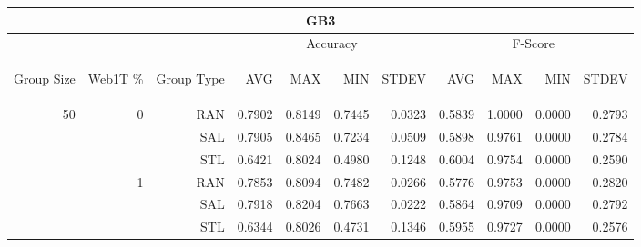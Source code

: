 \begin{center}
\begin{table}[htbp]
\begin{tabular}{ | r | r | r | r | r | r | r | r | r | r | r |}
\hline
\multicolumn{11}{|c|}{GB3}\\
\hline
 & & & \multicolumn{4}{|c|}{Accuracy} & \multicolumn{4}{|c|}{F-Score}\\ \cline{4-11}
\begin{sideways}Group Size\end{sideways} & \begin{sideways}Web1T \%\end{sideways} & \begin{sideways}Group Type\end{sideways} & \begin{sideways}AVG\end{sideways} & \begin{sideways}MAX\end{sideways} & \begin{sideways}MIN\end{sideways} & \begin{sideways}STDEV\end{sideways} & \begin{sideways}AVG\end{sideways} & \begin{sideways}MAX\end{sideways} & \begin{sideways}MIN\end{sideways} & \begin{sideways}STDEV\end{sideways}\\
\hline
\multirow{12}{*}{50}
 & \multirow{3}{*}{0} & RAN & 0.7902 & 0.8149 & 0.7445 & 0.0323 & 0.5839 & 1.0000 & 0.0000 & 0.2793\\ \cline{3-11}
 &   & SAL & 0.7905 & 0.8465 & 0.7234 & 0.0509 & 0.5898 & 0.9761 & 0.0000 & 0.2784\\ \cline{3-11}
 &   & STL & 0.6421 & 0.8024 & 0.4980 & 0.1248 & 0.6004 & 0.9754 & 0.0000 & 0.2590\\ \cline{2-11}
 & \multirow{3}{*}{1} & RAN & 0.7853 & 0.8094 & 0.7482 & 0.0266 & 0.5776 & 0.9753 & 0.0000 & 0.2820\\ \cline{3-11}
 &   & SAL & 0.7918 & 0.8204 & 0.7663 & 0.0222 & 0.5864 & 0.9709 & 0.0000 & 0.2792\\ \cline{3-11}
 &   & STL & 0.6344 & 0.8026 & 0.4731 & 0.1346 & 0.5955 & 0.9727 & 0.0000 & 0.2576\\ \cline{2-11}

\end{tabular}
\end{table}
\end{center}
